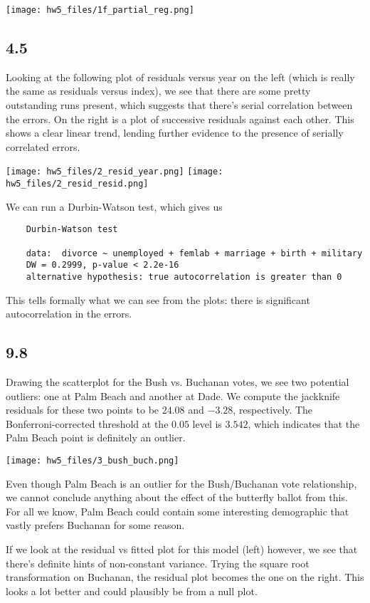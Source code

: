 \documentclass{article}
\begin{document}
\texttt{[image: hw5\_files/1f\_partial\_reg.png]}

\subsection*{4.5}
Looking at the following plot of residuals versus year on the left (which is really the same as residuals versus index), we see that there are some pretty outstanding runs present, which suggests that there's serial correlation between the errors. On the right is a plot of successive residuals against each other. This shows a clear linear trend, lending further evidence to the presence of serially correlated errors.

\texttt{[image: hw5\_files/2\_resid\_year.png]}
\texttt{[image: hw5\_files/2\_resid\_resid.png]}

We can run a Durbin-Watson test, which gives us 
\begin{verbatim}
    Durbin-Watson test

    data:  divorce ~ unemployed + femlab + marriage + birth + military
    DW = 0.2999, p-value < 2.2e-16
    alternative hypothesis: true autocorrelation is greater than 0
\end{verbatim}
This tells formally what we can see from the plots: there is significant autocorrelation in the errors.
\subsection*{9.8}
Drawing the scatterplot for the Bush vs. Buchanan votes, we see two potential outliers: one at Palm Beach and another at Dade. We compute the jackknife residuals for these two points to be $24.08$ and $-3.28$, respectively. The Bonferroni-corrected threshold at the $0.05$ level is $3.542$, which indicates that the Palm Beach point is definitely an outlier.

\texttt{[image: hw5\_files/3\_bush\_buch.png]}

Even though Palm Beach is an outlier for the Bush/Buchanan vote relationship, we cannot conclude anything about the effect of the butterfly ballot from this. For all we know, Palm Beach could contain some interesting demographic that vastly prefers Buchanan for some reason. 

If we look at the residual vs fitted plot for this model (left) however, we see that there's definite hints of non-constant variance. Trying the square root transformation on Buchanan, the residual plot becomes the one on the right. This looks a lot better and could plausibly be from a null plot.
\end{document}

